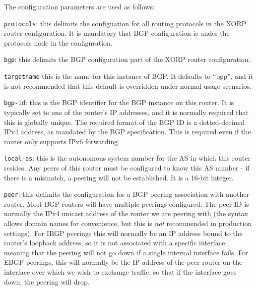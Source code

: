 \noindent
The configuration parameters are used as follows:
\begin{description}
\item{\tt protocols}: this delimits the configuation for all routing
  protocols in the XORP router configuration.  It is mandatory that
  BGP configuration is under the {\stt protocols} node in the
  configuration.
\item{\tt bgp}: this delimits the BGP configuration part of the XORP
  router configuration.
\item{\tt targetname} this is the name for this instance of BGP.  It
  defaults to ``{\stt bgp}'', and it is not recommended that this
  default is overridden under normal usage scenarios.
\item{\tt bgp-id}: this is the BGP identifier for the BGP instance on
  this router.  It is typically set to one of the router's IP
  addresses, and it is normally required that this is globally unique.
  The required format of the BGP ID is a dotted-decimal IPv4 address,
  as mandated by the BGP specification.  This is required even if the
  router only supports IPv6 forwarding.
\item{\tt local-as}: this is the autonomous system number for the AS
  in which this router resides.  Any peers of this router must be
  configured to know this AS number - if there is a mismatch, a
  peering will not be established.  It is a 16-bit integer.
\item{\tt peer}: this delimits the configuration for a BGP peering
  association with another router.  Most BGP routers will have
  multiple peerings configured.  The peer ID is normally the IPv4
  unicast address of the router we are peering with (the syntax allows
  domain names for convenience, but this is {\it not} recommended in
  production settings).  For IBGP peerings this will normally be an IP
  address bound to the router's loopback address, so it is not
  associated with a specific interface, meaning that the peering will
  not go down if a single internal interface fails.  For EBGP
  peerings, this will normally be the IP address of the peer router on
  the interface over which we wish to exchange traffic, so that if the
  interface goes down, the peering will drop.


\end{description}
